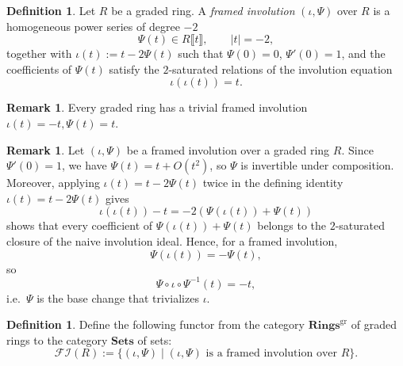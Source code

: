 \documentclass[a4paper]{amsart}
\theoremstyle{plain}
\theoremstyle{definition}
\newtheorem{definition}[subsubsection]{Definition}
\newtheorem{remark}[subsubsection]{Remark}
\begin{document}
\begin{definition}
	Let $R$ be a graded ring. A \emph{framed involution} $(\iota, \Psi)$ over $R$ is a homogeneous power series of degree $-2$
	\[
		\Psi(t)\in R\llbracket t\rrbracket,\qquad |t|=-2,
	\]
	together with $\iota(t) := t-2\Psi(t)$ such that $\Psi(0)=0$, $\Psi'(0)=1$, and the coefficients of $\Psi(t)$ satisfy the $2$-saturated relations of the involution equation
	\[
		\iota(\iota(t))=t.
	\]
\end{definition}

\begin{remark}
	Every graded ring has a trivial framed involution $\iota(t) = -t, \Psi(t) = t$.
\end{remark}
\begin{remark}
	Let $(\iota, \Psi)$ be a framed involution over a graded ring $R$. Since $\Psi'(0)=1$, we have $\Psi(t)=t+O(t^2)$, so $\Psi$ is invertible under composition. Moreover, applying $\iota(t)=t-2\Psi(t)$ twice in the defining identity $\iota(t)=t-2\Psi(t)$ gives
	\[
		\iota(\iota(t))-t=-2\left(\Psi(\iota(t))+\Psi(t)\right)
	\]
	shows that every coefficient of $\Psi(\iota(t))+\Psi(t)$ belongs to the $2$-saturated closure of the naive involution ideal. Hence, for a framed involution,
	\[
		\Psi(\iota(t))=-\Psi(t),
	\]
	so
	\begin{equation}\label{eq:psi-trivializes-epsilon}
		\Psi\circ \iota\circ \Psi^{-1}(t)=-t,
	\end{equation}
	i.e.\ $\Psi$ is the base change that trivializes $\iota$.
\end{remark}
\begin{definition}
	Define the following functor from the category $\mathbf{Rings}^{\mathrm{gr}}$ of graded rings to the category $\mathbf{Sets}$ of sets:
	\[
		\mathcal{FI}(R):=\{(\iota, \Psi)\mid (\iota, \Psi)\text{ is a framed involution over }R\}.
	\]
\end{definition}
\end{document}
